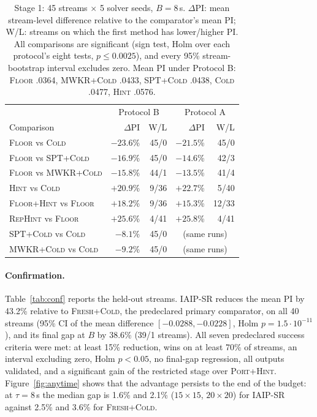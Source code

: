 \documentclass[letterpaper]{article} %
\newcommand{\mcold}{\textsc{Cold}}
\newcommand{\mhint}{\textsc{Hint}}
\newcommand{\mfloor}{\textsc{Floor}}
\newcommand{\mfh}{\textsc{Floor+Hint}}
\newcommand{\mrho}{\textsc{RepHint}}
\newcommand{\mspt}{\textsc{SPT+Cold}}
\newcommand{\mmwkr}{\textsc{MWKR+Cold}}
\newcommand{\miaip}{\textsc{IAIP-SR}}
\newcommand{\mfresh}{\textsc{Fresh+Cold}}
\newcommand{\mph}{\textsc{Port+Hint}}
\begin{document}
\begin{table}[t]
\centering
\small
\setlength{\tabcolsep}{3pt}
\begin{tabular}{lrrrr}
\toprule
 & \multicolumn{2}{c}{Protocol B} & \multicolumn{2}{c}{Protocol A} \\
Comparison & $\Delta$PI & W/L & $\Delta$PI & W/L \\
\midrule
\mfloor{} vs \mcold & $-23.6$\% & 45/0 & $-21.5$\% & 45/0 \\
\mfloor{} vs \mspt & $-16.9$\% & 45/0 & $-14.6$\% & 42/3 \\
\mfloor{} vs \mmwkr & $-15.8$\% & 44/1 & $-13.5$\% & 41/4 \\
\mhint{} vs \mcold & $+20.9$\% & 9/36 & $+22.7$\% & 5/40 \\
\mfh{} vs \mfloor & $+18.2$\% & 9/36 & $+15.3$\% & 12/33 \\
\mrho{} vs \mfloor & $+25.6$\% & 4/41 & $+25.8$\% & 4/41 \\
\mspt{} vs \mcold & $-8.1$\% & 45/0 & \multicolumn{2}{c}{(same runs)} \\
\mmwkr{} vs \mcold & $-9.2$\% & 45/0 & \multicolumn{2}{c}{(same runs)} \\
\bottomrule
\end{tabular}
\caption{Stage 1: 45 streams $\times$ 5 solver seeds, $B=8$\,s. $\Delta$PI: mean stream-level difference relative to the comparator's mean PI; W/L: streams on which the first method has lower/higher PI. All comparisons are significant (sign test, Holm over each protocol's eight tests, $p\le 0.0025$), and every 95\% stream-bootstrap interval excludes zero. Mean PI under Protocol B: \mfloor{} .0364, \mmwkr{} .0433, \mspt{} .0438, \mcold{} .0477, \mhint{} .0576.}
\label{tab:gate1}
\end{table}

\paragraph{Confirmation.} Table~\ref{tab:conf} reports the held-out streams. \miaip{} reduces the mean PI by 43.2\% relative to \mfresh, the predeclared primary comparator, on all 40 streams (95\% CI of the mean difference $[-0.0288,-0.0228]$, Holm $p=1.5\cdot10^{-11}$), and its final gap at $B$ by 38.6\% (39/1 streams). All seven predeclared success criteria were met: at least 15\% reduction, wins on at least 70\% of streams, an interval excluding zero, Holm $p<0.05$, no final-gap regression, all outputs validated, and a significant gain of the restricted stage over \mph. Figure~\ref{fig:anytime} shows that the advantage persists to the end of the budget: at $\tau=8$\,s the median gap is 1.6\% and 2.1\% ($15{\times}15$, $20{\times}20$) for \miaip{} against 2.5\% and 3.6\% for \mfresh.
\end{document}
